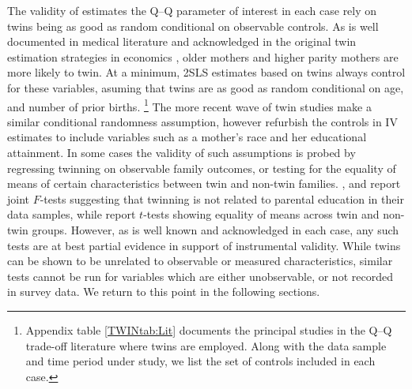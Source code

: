 \documentclass[subeqn]{article}
\begin{document}
\begin{spacing}{1.4}

The validity of estimates the Q--Q parameter of interest in each case rely on
twins being as good as random conditional on observable controls.  As is well
documented in medical literature \citep{Hall2003} and acknowledged in the
original twin estimation strategies in economics \citep{RosenzweigWolpin1980},
older mothers and higher parity mothers are more likely to twin.  At a minimum,
2SLS estimates based on twins always control for these variables, asuming that
twins are as good as random conditional on age, and number of prior births.%
\footnote{Appendix table \ref{TWINtab:Lit} documents the principal studies in
  the Q--Q trade-off literature where twins are employed.  Along with the data
  sample and time period under study, we list the set of controls included in
  each case.} The more recent wave of twin studies make a similar conditional
randomness assumption, however refurbish the controls in IV estimates to
include variables such as a mother's race and her educational attainment.  In
some cases the validity of such assumptions is probed by regressing twinning
on observable family outcomes, or testing for the equality of means of certain
characteristics between twin and non-twin families. \citet{Blacketal2005},
\citet{Lietal2008} and \citet{Sanhueza2009} report joint $F$-tests suggesting
that twinning is not related to parental education in their data samples, while 
\citet{RosenzweigZhang2009} report $t$-tests showing equality of means across 
twin and non-twin groups. However, as is well known and acknowledged in each 
case, any such tests are at best partial evidence in support of instrumental 
validity. While twins can be shown to be unrelated to observable or measured 
characteristics, similar tests cannot be run for variables which are either 
unobservable, or not recorded in survey data. We return to this point in the 
following sections.


\end{spacing}
\end{document}

